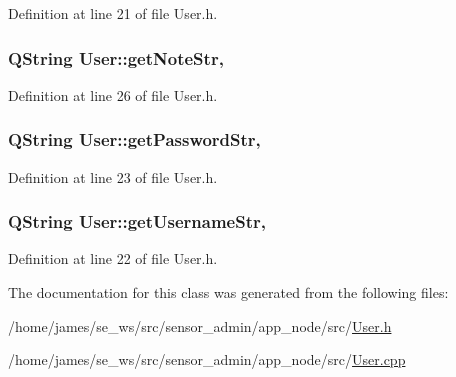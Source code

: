Definition at line 21 of file User.\-h.

\hypertarget{class_user_ab12c4e0a681f1feed774cb611f5c36a5}{
\subsubsection[{get\-Note\-Str}]{\setlength{\rightskip}{0pt plus 5cm}Q\-String User\-::get\-Note\-Str\hspace{0.3cm}{\ttfamily [read]}, {\ttfamily [write]}}}\label{class_user_ab12c4e0a681f1feed774cb611f5c36a5}


Definition at line 26 of file User.\-h.

\hypertarget{class_user_aef3f929e80bfd33f8cf6dbc3f6841462}{
\subsubsection[{get\-Password\-Str}]{\setlength{\rightskip}{0pt plus 5cm}Q\-String User\-::get\-Password\-Str\hspace{0.3cm}{\ttfamily [read]}, {\ttfamily [write]}}}\label{class_user_aef3f929e80bfd33f8cf6dbc3f6841462}


Definition at line 23 of file User.\-h.

\hypertarget{class_user_a6b3ceae4978abc4d9e9c6c4c34222e88}{
\subsubsection[{get\-Username\-Str}]{\setlength{\rightskip}{0pt plus 5cm}Q\-String User\-::get\-Username\-Str\hspace{0.3cm}{\ttfamily [read]}, {\ttfamily [write]}}}\label{class_user_a6b3ceae4978abc4d9e9c6c4c34222e88}


Definition at line 22 of file User.\-h.



The documentation for this class was generated from the following files\-:\begin{DoxyCompactItemize}
\item 
/home/james/se\-\_\-ws/src/sensor\-\_\-admin/app\-\_\-node/src/\hyperlink{app__node_2src_2_user_8h}{User.\-h}\item 
/home/james/se\-\_\-ws/src/sensor\-\_\-admin/app\-\_\-node/src/\hyperlink{app__node_2src_2_user_8cpp}{User.\-cpp}\end{DoxyCompactItemize}
